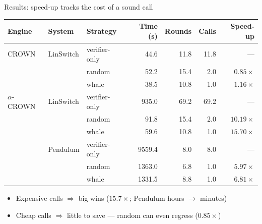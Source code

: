 \documentclass{beamer}
\begin{document}
\begin{frame}{Results: speed-up tracks the cost of a sound call}
  \centering\small
  \renewcommand{\arraystretch}{0.95}
  \begin{tabular}{lll rrr r}
    \toprule
    Engine & System & Strategy & Time (s) & Rounds & Calls & Speed-up \\
    \midrule
    CROWN          & LinSwitch & verifier-only & 44.6   & 11.8 & 11.8 & --- \\
                   &           & random        & 52.2   & 15.4 & 2.0  & \alert{$0.85\times$} \\
                   &           & whale         & 38.5   & 10.8 & 1.0  & $1.16\times$ \\
    \midrule
    $\alpha$-CROWN & LinSwitch & verifier-only & 935.0  & 69.2 & 69.2 & --- \\
                   &           & random        & 91.8   & 15.4 & 2.0  & $10.19\times$ \\
                   &           & whale         & 59.6   & 10.8 & 1.0  & \textbf{$15.70\times$} \\
                   & Pendulum  & verifier-only & 9559.4 & 8.0  & 8.0  & --- \\
                   &           & random        & 1363.0 & 6.8  & 1.0  & $5.97\times$ \\
                   &           & whale         & 1331.5 & 8.8  & 1.0  & $6.81\times$ \\
    \bottomrule
  \end{tabular}

  \vspace{2mm}
  \begin{itemize}\small
    \item Expensive calls $\Rightarrow$ big wins ($15.7\times$; Pendulum hours $\to$ minutes)
    \item Cheap calls $\Rightarrow$ little to save --- random can even regress ($0.85\times$)
  \end{itemize}
\end{frame}

\end{document}
